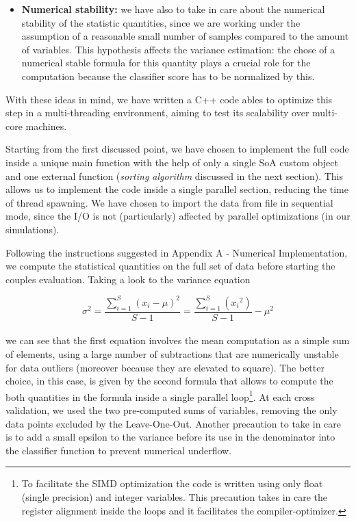 \documentclass{standalone}
\begin{document}
\begin{itemize}
\item \textbf{Numerical stability:} we have also to take in care about the numerical stability of the statistic quantities, since we are working under the assumption of a reasonable small number of samples compared to the amount of variables.
This hypothesis affects the variance estimation: the chose of a numerical stable formula for this quantity plays a crucial role for the computation because the classifier score has to be normalized by this.

\end{itemize}

With these ideas in mind, we have written a \textsf{C++} code ables to optimize this step in a multi-threading environment, aiming to test its scalability over multi-core machines.

Starting from the first discussed point, we have chosen to implement the full code inside a unique main function with the help of only a single SoA custom object and one external function (\emph{sorting algorithm} discussed in the next section).
This allows us to implement the code inside a single parallel section, reducing the time of thread spawning.
We have chosen to import the data from file in sequential mode, since the I/O is not (particularly) affected by parallel optimizations (in our simulations).

Following the instructions suggested in Appendix A - Numerical Implementation, we compute the statistical quantities on the full set of data before starting the couples evaluation.
Taking a look to the variance equation

$$
\sigma^2 = \frac{\sum_{i=1}^{S}(x_i - \mu)^2} {S - 1} = \frac{\sum_{i=1}^{S}({x_i}^2)} {S - 1} - \mu^2
$$
\\
we can see that the first equation involves the mean computation as a simple sum of elements, using a large number of subtractions that are numerically unstable for data outliers (moreover because they are elevated to square).
The better choice, in this case, is given by the second formula that allows to compute the both quantities in the formula inside a single parallel loop\footnote{
  To facilitate the SIMD optimization the code is written using only float (single precision) and integer variables.
  This precaution takes in care the register alignment inside the loops and it facilitates the compiler-optimizer.
}.
At each cross validation, we used the two pre-computed sums of variables, removing the only data points excluded by the Leave-One-Out.
Another precaution to take in care is to add a small epsilon to the variance before its use in the denominator into the classifier function to prevent numerical underflow.
\end{document}
